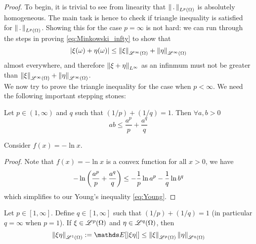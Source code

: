 \begin{unexaminable}
\textit{Proof.} To begin, it is trivial to see from linearity that $\left\| \,.\, \right\|_{L^p(\Omega)}$ is absolutely homogeneous. The main task is hence to check if triangle inequality is satisfied for $\left\| \,.\, \right\|_{L^p(\Omega)}$. Showing this for the case $p = \infty$ is not hard: we can run through the steps in proving \eqref{eq:Minkowski_infty} to show that 
\begin{equation*}
    |\xi(\omega) + \eta(\omega)| \leq \left\| \xi \right\|_{\mathcal{L}^\infty(\Omega)} + \left\| \eta \right\|_{\mathcal{L}^\infty(\Omega)}
\end{equation*}
almost everywhere, and therefore $\left\| \xi + \eta \right\|_{L^\infty}$ as an infinmum must not be greater than $\left\| \xi \right\|_{\mathcal{L}^\infty(\Omega)} + \left\| \eta \right\|_{\mathcal{L}^\infty(\Omega)}$.\\

We now try to prove the triangle inequality for the case when $p<\infty$. We need the following important stepping stones:

\begin{proposition}
Let $p \in (1,\infty)$ and $q$ such that $(1/p) + (1/q) = 1$. Then $\forall a,b > 0$
\begin{equation} \label{eq:Young}
    ab \leq \frac{a^p}{p} + \frac{a^q}{q}
\end{equation}
\end{proposition}

\begin{hint}
Consider $f(x) = -\ln x$.
\end{hint}

\begin{proof}
Note that $f(x) = -\ln x$ is a convex function for all $x > 0$, we have
\begin{equation*}
    -\ln\left( \frac{a^p}{p} + \frac{a^q}{q} \right) \leq -\frac{1}{p} \ln a^p - \frac{1}{q} \ln b^q
\end{equation*}
which simplifies to our Young's inequality \eqref{eq:Young}.
\end{proof}

\begin{proposition}
Let $p \in [1,\infty]$. Define $q \in [1,\infty]$ such that $(1/p)+(1/q) = 1$ (in particular $q = \infty$ when $p = 1$). If $\xi \in \mathcal{L}^p(\Omega)$ and $\eta \in \mathcal{L}^q(\Omega)$, then
\begin{equation} \label{eq:Holder}
    \norm{\xi \eta}_{\L^1(\Omega)} := \E[|\xi \eta|] \leq \norm{\xi}_{\L^p(\Omega)} \norm{\eta}_{\L^q(\Omega)}
\end{equation}
\end{proposition}


\end{unexaminable}
